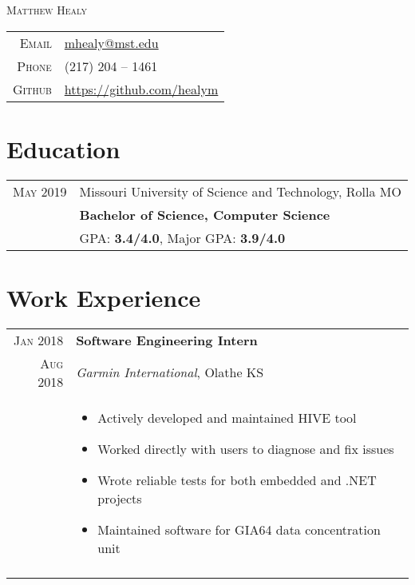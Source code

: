 \documentclass[a4paper,10pt]{article}
\newcommand{\br}{\\\multicolumn{2}{c}{}}
\begin{document}
\pagestyle{empty}

\par{\centering
    {\Huge \textsc{Matthew Healy}
}\bigskip\par}

\begin{center}
\begin{tabular}{rl}
    \textsc{Email } & \href{mailto:mhealy@mst.edu}{mhealy@mst.edu} \\
    \textsc{Phone }        & (217) 204 -- 1461  \\
    \textsc{Github }       & \url{https://github.com/healym} \\
\end{tabular}
\end{center}

\section{Education}
\begin{tabular}{r|p{15cm}}
    \textsc{May} 2019 & Missouri University of Science and Technology, Rolla MO  \\
                      & \textbf{Bachelor of Science, Computer Science} \\
                      & GPA: \textbf{3.4/4.0}, Major GPA: \textbf{3.9/4.0} \\
\end{tabular}


\section{Work Experience}

\begin{tabular}{r|p{15cm}}
    \textsc{Jan 2018} & \textbf{Software Engineering Intern} \\
    \textsc{Aug 2018} & \textit{Garmin International}, Olathe KS \\ &
    \begin{itemize}
    \item Actively developed and maintained HIVE tool
     \item Worked directly with users to diagnose and fix issues
    \item Wrote reliable tests for both embedded and .NET projects
    \item Maintained software for GIA64 data concentration unit

    \end{itemize} \br\\

\end{tabular}
\end{document}
